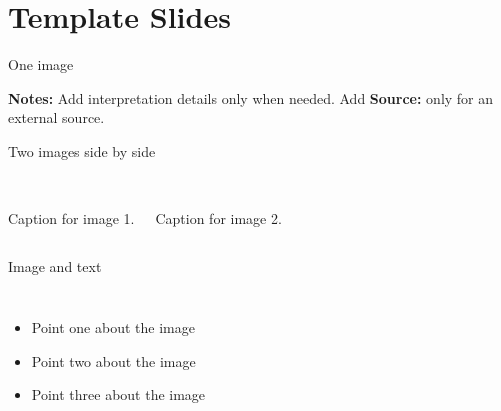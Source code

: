 \documentclass[aspectratio=169]{beamer}
\newcommand{\visualnote}[1]{%
  \par\vspace{0.12cm}%
  {\scriptsize\color{gray}#1}%
}
\begin{document}
\section{Template Slides}

\begin{frame}{One image}
	\begin{figure}
		\centering
	\end{figure}
	\visualnote{\textbf{Notes:} Add interpretation details only when needed.
	Add \textbf{Source:} only for an external source.}
\end{frame}

\begin{frame}{Two images side by side}
	\begin{columns}[T]
		\centering
		\\
		\small Caption for image 1.

		\centering
		\\
		\small Caption for image 2.
	\end{columns}
\end{frame}

\begin{frame}{Image and text}
	\begin{columns}[c]
		\begin{itemize}
			\item Point one about the image
			\item Point two about the image
			\item Point three about the image
		\end{itemize}

		\centering
	\end{columns}
\end{frame}
\end{document}
